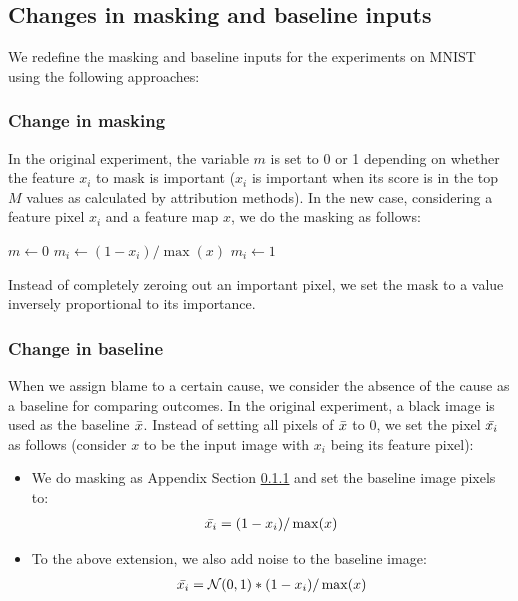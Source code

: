 \subsection{Changes in masking and baseline inputs}
\label{section:3_approaches}
We redefine the masking and baseline inputs for the experiments on MNIST using the following approaches:

\vspace{-3mm}
\subsubsection{Change in masking} \label{sssec:changemasking} In the original experiment, the variable $m$ is set to 0 or 1 depending on whether the feature $x_i$ to mask is important ($x_i$ is important when its score is in the top $M$ values as calculated by attribution methods). In the new case, considering a feature pixel $x_i$ and a feature map $x$, we do the masking as follows:

\begin{algorithmic}
\STATE $m \gets 0$
  \STATE $m_i\gets (1-x_i)/\max(x)$
\ELSE
    \STATE $m_i\gets 1$  
\ENDIF 
\end{algorithmic}

Instead of completely zeroing out an important pixel, we set the mask to a value inversely proportional to its importance. 

\subsubsection{Change in baseline} When we assign blame to a certain cause, we consider the absence of the cause as a baseline for comparing outcomes. In the original experiment, a black image is used as the baseline $\Bar{x}$. Instead of setting all pixels of $\Bar{x}$ to 0, we set the pixel $\Bar{x_i}$ as follows (consider $x$ to be the input image with $x_i$ being its feature pixel): 
\begin{itemize}
    \item We do masking as Appendix Section \ref{sssec:changemasking} and set the baseline image pixels to:
     \begin{align} \label{eqn:app2}
         \Bar{x_i} = (1-x_i)/\max(x)
     \end{align}
  
    \item To the above extension, we also add noise to the baseline image:
     \begin{align} \label{eqn:app3}
         \Bar{x_i} = \mathcal{N}(0,1)*(1-x_i)/\max(x)
     \end{align}
\end{itemize}


